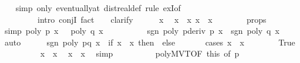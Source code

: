\begin{isabellebody}
\ \ \isamarkupfalse%
\ {\isacharparenleft}simp\ only{\isacharcolon}\ eventually{\isacharunderscore}at\ dist{\isacharunderscore}real{\isacharunderscore}def{\isacharcomma}\ rule\ exI{\isacharbrackleft}of\ {\isacharunderscore}\ {\isasymepsilon}{\isacharbrackright}{\isacharcomma}\isanewline
\ \ \ \ \ \ \ \ \ intro\ conjI{\isacharcomma}\ fact\ {\isacharbackquoteopen}{\isasymepsilon}\ {\isachargreater}\ {}{\isacharbackquoteclose}{\isacharcomma}\ clarify{\isacharparenright}\isanewline
\ \ \ \ \isamarkupfalse%
\ x\ \isamarkupfalse%
\ {\isachardoublequoteopen}x\ {\isasymnoteq}\ x\ {\isachardoublequoteopen}{\isasymbar}x\ {\isacharminus}\ x\ {\isacharless}\ {\isasymepsilon}{\isachardoublequoteclose}\isanewline
\ \ \ \ \isamarkupfalse%
\ {\isasymepsilon}{\isacharunderscore}props\ \isamarkupfalse%
\ {\isacharbrackleft}simp{\isacharbrackright}{\isacharcolon}\ {\isachardoublequoteopen}poly\ p\ x\ {\isasymnoteq}\ {}{\isachardoublequoteclose}\ {\isachardoublequoteopen}poly\ q\ x\ {\isasymnoteq}\ {}{\isachardoublequoteclose}\isanewline
\ \ \ \ \ \ \ \ {\isachardoublequoteopen}sgn\ {\isacharparenleft}poly\ {\isacharparenleft}pderiv\ p{\isacharparenright}\ x{\isacharparenright}\ {\isacharequal}\ sgn\ {\isacharparenleft}poly\ q\ x{\isacharparenright}{\isachardoublequoteclose}\ \isamarkupfalse%
\ auto\isanewline
\ \ \ \ \isamarkupfalse%
\ {\isachardoublequoteopen}sgn\ {\isacharparenleft}poly\ {\isacharparenleft}p{\isacharasterisk}q{\isacharparenright}\ x{\isacharparenright}\ {\isacharequal}\ {\isacharparenleft}if\ x\ {\isachargreater}\ x\ then\ {}\ else\ {\isacharminus}{}{\isacharparenright}{\isachardoublequoteclose}\isanewline
\ \ \ \ \isamarkupfalse%
\ {\isacharparenleft}cases\ {\isachardoublequoteopen}x\ {\isasymge}\ x\isanewline
\ \ \ \ \ \ \isamarkupfalse%
\ True\isanewline
\ \ \ \ \ \ \ \ \isamarkupfalse%
\ {\isacharbackquoteopen}x\ {\isasymnoteq}\ x\ \isamarkupfalse%
\ {\isachardoublequoteopen}x\ {\isachargreater}\ x\ \isamarkupfalse%
\ simp\isanewline
\ \ \ \ \ \ \ \ \isamarkupfalse%
\ poly{\isacharunderscore}MVT{\isacharbrackleft}OF\ this{\isacharcomma}\ of\ p{\isacharbrackright}\ \isamarkupfalse%

\end{isabellebody}
